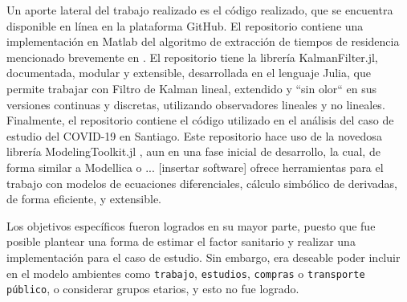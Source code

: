 Un aporte lateral del trabajo realizado es el código realizado, que se encuentra disponible en línea en la plataforma GitHub. El repositorio \url{} contiene una implementación en Matlab del algoritmo de extracción de tiempos de residencia mencionado brevemente en \cite{Munizaga2011}. El repositorio \url{} tiene la librería KalmanFilter.jl, documentada, modular y extensible, desarrollada en el lenguaje Julia, que permite trabajar con Filtro de Kalman lineal, extendido y ``sin olor`` en sus versiones continuas y discretas, utilizando observadores lineales y no lineales. Finalmente, el repositorio \url{} contiene el código utilizado en el análisis del caso de estudio del COVID-19 en Santiago. Este repositorio hace uso de la novedosa librería ModelingToolkit.jl \cite{}, aun en una fase inicial de desarrollo, la cual, de forma similar a Modellica o ... [insertar software] ofrece herramientas para el trabajo con modelos de ecuaciones diferenciales, cálculo simbólico de derivadas, de forma eficiente, y extensible.


Los objetivos específicos fueron logrados en su mayor parte, puesto que fue posible plantear una forma de estimar el factor sanitario y realizar una implementación para el caso de estudio. Sin embargo, era deseable poder incluir en el modelo ambientes como \texttt{trabajo}, \texttt{estudios}, \texttt{compras} o \texttt{transporte público}, o considerar grupos etarios, y esto no fue logrado.